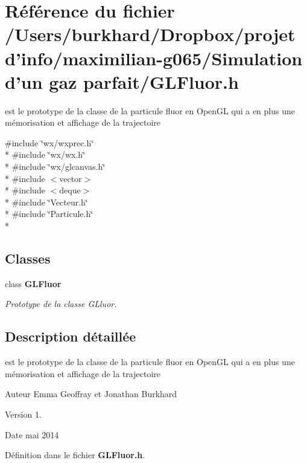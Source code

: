 \section{Référence du fichier /\+Users/burkhard/\+Dropbox/projet d'info/maximilian-\/g065/\+Simulation d'un gaz parfait/\+G\+L\+Fluor.h}
\label{_g_l_fluor_8h}


est le prototype de la classe de la particule fluor en Open\+G\+L qui a en plus une mémorisation et affichage de la trajectoire  


{\ttfamily \#include \char`\"{}wx/wxprec.\+h\char`\"{}}\\*
{\ttfamily \#include \char`\"{}wx/wx.\+h\char`\"{}}\\*
{\ttfamily \#include \char`\"{}wx/glcanvas.\+h\char`\"{}}\\*
{\ttfamily \#include $<$vector$>$}\\*
{\ttfamily \#include $<$deque$>$}\\*
{\ttfamily \#include \char`\"{}Vecteur.\+h\char`\"{}}\\*
{\ttfamily \#include \char`\"{}Particule.\+h\char`\"{}}\\*
\subsection*{Classes}
\begin{DoxyCompactItemize}
\item 
class {\bf G\+L\+Fluor}
\begin{DoxyCompactList}\small\item\em Prototype de la classe G\+Lluor. \end{DoxyCompactList}\end{DoxyCompactItemize}


\subsection{Description détaillée}
est le prototype de la classe de la particule fluor en Open\+G\+L qui a en plus une mémorisation et affichage de la trajectoire 

\begin{DoxyAuthor}{Auteur}
Emma Geoffray et Jonathan Burkhard 
\end{DoxyAuthor}
\begin{DoxyVersion}{Version}
1. 
\end{DoxyVersion}
\begin{DoxyDate}{Date}
mai 2014 
\end{DoxyDate}


Définition dans le fichier {\bf G\+L\+Fluor.\+h}.

